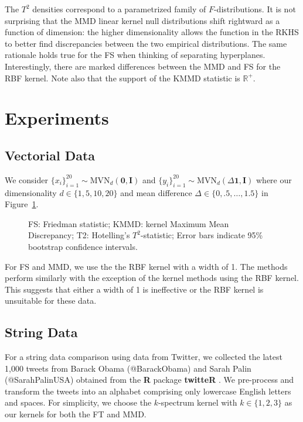 The $T^2$ densities correspond to a
parametrized family of $F$-distributions.  It is not surprising that the MMD
linear kernel null distributions shift rightward as a function of
dimension: the higher dimensionality allows the function in the RKHS
to better find discrepancies between the two empirical distributions.
The same rationale holds true for the FS when thinking of separating
hyperplanes.  Interestingly, there are marked differences between the
MMD and FS for the RBF kernel.  Note also that the support of the KMMD
statistic is $\mathbb{R}^+$.

\section{Experiments}
\subsection{Vectorial Data}
We consider $\{x_i\}_{i=1}^{20} \sim \mathrm{MVN}_d(\mathbf{0},
\mathbf{I})$ and $\{y_i\}_{i=1}^{20} \sim
\mathrm{MVN}_d(\Delta \mathbf{1}, \mathbf{I})$ where our
dimensionality $d \in \{1, 5, 10, 20\}$ and mean difference $\Delta \in
\{0, .5, \ldots, 1.5\}$ in Figure~\ref{fig:power_normal}.

\begin{figure}
  \begin{center}
    \resizebox{14.0cm}{!}{
      
    }
  \end{center}
  \caption{FS: Friedman statistic; KMMD: kernel Maximum Mean
    Discrepancy; T2: Hotelling's $T^2$-statistic; Error bars indicate
    95\% bootstrap confidence intervals.}
  \label{fig:power_normal}
\end{figure}

For FS and MMD, we use the the RBF kernel with a width of 1.  The
methods perform similarly with the exception of the kernel methods
using the RBF kernel.  This suggests that either a width of 1 is
ineffective or the RBF kernel is unsuitable for these data.

\subsection{String Data}
\label{twitter_data}
For a string data comparison using data from Twitter, we collected the
latest 1,000 tweets from Barack Obama (@BarackObama) and Sarah Palin
(@SarahPalinUSA) obtained from the {\bf R} package {\bf twitteR}
\cite{twitteR}.  We pre-process and transform the tweets
into an alphabet comprising only lowercase English letters and spaces.
For simplicity, we
choose the $k$-spectrum kernel \cite{leslie2002spectrum} with
$k \in \{1, 2, 3 \}$
as our kernels for both the FT and MMD.

